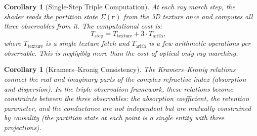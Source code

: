 \documentclass[11pt,twocolumn,a4paper]{article}
\newtheorem{corollary}[theorem]{Corollary}
\begin{document}
\begin{corollary}[Single-Step Triple Computation]
\label{cor:single-step}
At each ray march step, the shader reads the partition state
$\Sigma(\mathbf{r})$ from the 3D texture \emph{once} and computes all
three observables from it. The computational cost is:
\begin{equation}
T_{\mathrm{step}} = T_{\mathrm{texture}} + 3 \cdot T_{\mathrm{arith}},
\end{equation}
where $T_{\mathrm{texture}}$ is a single texture fetch and
$T_{\mathrm{arith}}$ is a few arithmetic operations per observable.
This is negligibly more than the cost of optical-only ray marching.
\end{corollary}

\begin{corollary}[Kramers--Kronig Consistency]
\label{cor:kramers-kronig}
The Kramers--Kronig relations \citep{kramerskronig1927} connect the
real and imaginary parts of the complex refractive index (absorption
and dispersion). In the triple observation framework, these relations
become constraints between the three observables: the absorption
coefficient, the retention parameter, and the conductance are not
independent but are mutually constrained by causality (the partition
state at each point is a single entity with three projections).
\end{corollary}
\end{document}
